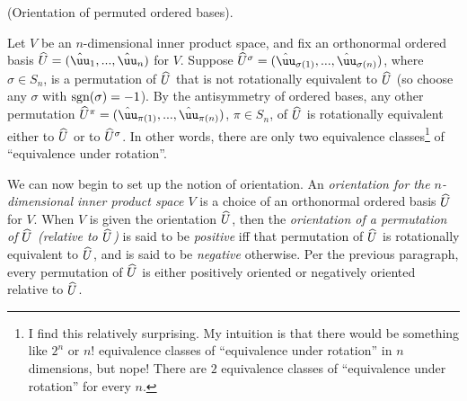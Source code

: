 \begin{defn}
    (Orientation of permuted ordered bases).
    
    Let $V$ be an $n$-dimensional inner product space, and fix an orthonormal ordered basis $\hU = (\huu_1, ..., \huu_n)$ for $V$. Suppose $\hU^\sigma = (\huu_{\sigma(1)}, ..., \huu_{\sigma(n)})$, where $\sigma \in S_n$, is a permutation of $\widehat{U}$ that is not rotationally equivalent to $\widehat{U}$ (so choose any $\sigma$ with $\text{sgn}(\sigma) = - 1$). By the antisymmetry of ordered bases, any other permutation $\hU^\pi = (\huu_{\pi(1)}, ..., \huu_{\pi(n)})$, $\pi \in S_n$, of $\widehat{U}$ is rotationally equivalent either to $\widehat{U}$ or to $\widehat{U}^\sigma$. In other words, there are only two equivalence classes\footnote{I find this relatively surprising. My intuition is that there would be something like $2^n$ or $n!$ equivalence classes of ``equivalence under rotation'' in $n$ dimensions, but nope! There are $2$ equivalence classes of ``equivalence under rotation'' for every $n$.} of ``equivalence under rotation''.
    
    We can now begin to set up the notion of orientation. An \textit{orientation for the $n$-dimensional inner product space $V$} is a choice of an orthonormal ordered basis $\widehat{U}$ for $V$. When $V$ is given the orientation $\widehat{U}$, then the \textit{orientation of a permutation of $\widehat{U}$ (relative to $\widehat{U}$)} is said to be \textit{positive} iff that permutation of $\widehat{U}$ is rotationally equivalent to $\widehat{U}$, and is said to be \textit{negative} otherwise. Per the previous paragraph, every permutation of $\widehat{U}$ is either positively oriented or negatively oriented relative to $\widehat{U}$.
\end{defn}

